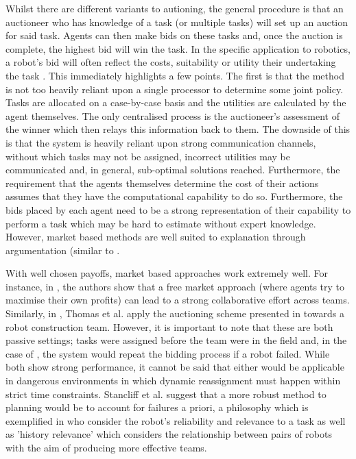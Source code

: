 \documentclass[preprint,8pt]{report}
\begin{document}
Whilst there are different variants to autioning, the general procedure is that an auctioneer who has knowledge of a task (or multiple tasks) will set up an auction for said task. Agents can then make bids on these tasks and, once the auction is complete, the highest bid will win the task. In the specific application to robotics, a robot's bid will often reflect the costs, suitability or utility their undertaking the task \cite{BernardineDias2006Market-basedAnalysis}. This immediately highlights a few points. The first is that the method is not too heavily reliant upon a single processor to determine some joint policy. Tasks are allocated on a case-by-case basis and the utilities are calculated by the agent themselves. The only centralised process is the auctioneer's assessment of the winner which then relays this information back to them. The downside of this is that the system is heavily reliant upon strong communication channels, without which tasks may not be assigned, incorrect utilities may be communicated and, in general, sub-optimal solutions reached. Furthermore, the requirement that the agents themselves determine the cost of their actions assumes that they have the computational capability to do so. Furthermore, the bids placed by each agent need to be a strong representation of their capability to perform a task which may be hard to estimate without expert knowledge. However, market based methods are well suited to explanation through argumentation (similar to \cite{Jung2001DistributedArgumentation}. 

With well chosen payoffs, market based approaches work extremely well. For instance, in \cite{Dias2000ASystem}, the authors show that a free market approach (where agents try to maximise their own profits) can lead to a strong collaborative effort across teams. Similarly, in \cite{Thomas2005Multi-robotScenarios}, Thomas et al. apply the auctioning scheme presented in \cite{Gerkey2002Sold:Coordination} towards a robot construction team. However, it is important to note that these are both passive settings; tasks were assigned before the team were in the field and, in the case of \cite{Gerkey2002Sold:Coordination}, the system would repeat the bidding process if a robot failed. While both show strong performance, it cannot be said that either would be applicable in dangerous environments in which dynamic reassignment must happen within strict time constraints. Stancliff et al. \cite{Stancliff2009PlanningAllocation} suggest that a more robust method to planning would be to account for failures a priori, a philosophy which is exemplified in \cite{Chen2010ACollaboration} who consider the robot's reliability and relevance to a task as well as 'history relevance' which considers the relationship between pairs of robots with the aim of producing more effective teams.
\end{document}
